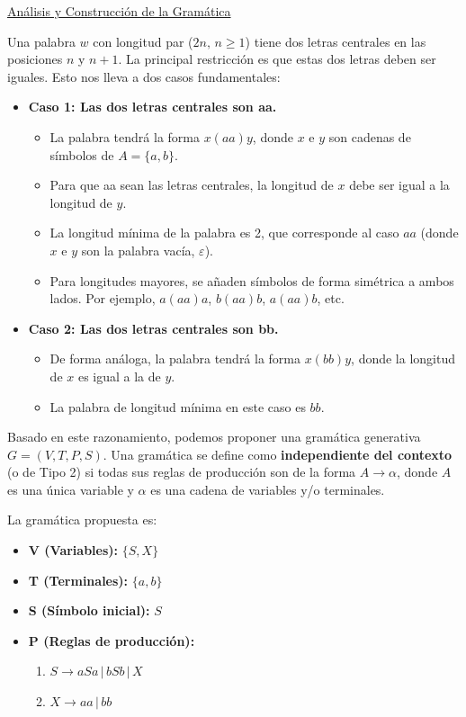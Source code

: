 \documentclass[12pt]{book} %
\begin{document}
\begin{ejercicio}
\begin{enumerate}[label=\alph*)]
\begin{solucion}
    \underline{Análisis y Construcción de la Gramática}

    Una palabra \( w \) con longitud par (\( 2n, \, n \geq 1 \)) tiene dos letras centrales en las posiciones \( n \) y \( n+1 \). La principal restricción es que estas dos letras deben ser iguales. Esto nos lleva a dos casos fundamentales:

    \begin{itemize}
        \item \textbf{Caso 1: Las dos letras centrales son aa.}
        \begin{itemize}
            \item La palabra tendrá la forma \( x(aa)y \), donde \( x \) e \( y \) son cadenas de símbolos de \( A = \{a, b\} \).
            \item Para que aa sean las letras centrales, la longitud de \( x \) debe ser igual a la longitud de \( y \).
            \item La longitud mínima de la palabra es 2, que corresponde al caso \( aa \) (donde \( x \) e \( y \) son la palabra vacía, \( \varepsilon \)).
            \item Para longitudes mayores, se añaden símbolos de forma simétrica a ambos lados. Por ejemplo, \( a(aa)a \), \( b(aa)b \), \( a(aa)b \), etc.
        \end{itemize}
        \item \textbf{Caso 2: Las dos letras centrales son bb.}
        \begin{itemize}
            \item De forma análoga, la palabra tendrá la forma \( x(bb)y \), donde la longitud de \( x \) es igual a la de \( y \).
            \item La palabra de longitud mínima en este caso es \( bb \).
        \end{itemize}
    \end{itemize}

    Basado en este razonamiento, podemos proponer una gramática generativa \( G = (V, T, P, S) \). Una gramática se define como \textbf{independiente del contexto} (o de Tipo 2) si todas sus reglas de producción son de la forma \( A \to \alpha \), donde \( A \) es una única variable y \( \alpha \) es una cadena de variables y/o terminales.

    La gramática propuesta es:
    \begin{itemize}
        \item \textbf{V (Variables):} \( \{S, X\} \)
        \item \textbf{T (Terminales):} \( \{a, b\} \)
        \item \textbf{S (Símbolo inicial):} \( S \)
        \item \textbf{P (Reglas de producción):}
        \begin{enumerate}
            \item \( S \to aSa \, | \, bSb \, | \, X \)
            \item \( X \to aa \, | \, bb \)
        \end{enumerate}
    \end{itemize}


\end{solucion}
\end{enumerate}
\end{ejercicio}
\end{document}
